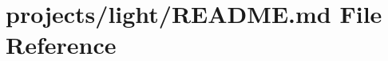 \hypertarget{projects_2light_2README_8md}{}\section{projects/light/\+R\+E\+A\+D\+ME.md File Reference}
\label{projects_2light_2README_8md}

